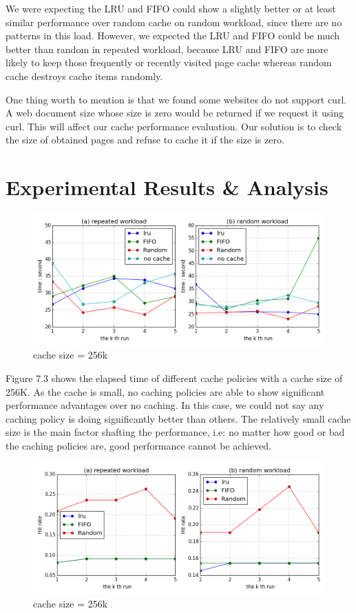 \documentclass[paper=a4, fontsize=11pt]{scrartcl} %
\numberwithin{equation}{section} %
\numberwithin{figure}{section} %
\numberwithin{table}{section} %
\begin{document}
We were expecting the LRU and FIFO could show a slightly better or at least similar performance over random cache on random workload, since there are no patterns in this load. However, we expected the LRU and FIFO could be much better than random in repeated workload, because LRU and FIFO are more likely to keep those frequently or recently visited page cache whereas random cache destroys cache items randomly. 

One thing worth to mention is that we found some websites do not support curl. A web document size whose size is zero would be returned if we request it using curl. This will affect our cache performance evaluation. Our solution is to check the size of obtained pages and refuse to cache it if the size is zero. 

\section{Experimental Results \& Analysis}
\begin{figure}[h]
  \centering
  \includegraphics[width=\textwidth]{../data/time256k}
  \caption{cache size = 256k}
  \label{fig:time256k}
\end{figure}
Figure 7.3 shows the elapsed time of different cache policies with a cache size of 256K. As the cache is small, no caching policies are able to show significant performance advantages over no caching. In this case, we could not say any caching policy is doing significantly better than others. The relatively small cache size is the main factor shafting the performance, i.e: no matter how good or bad the caching policies are, good performance cannot be achieved.
\begin{figure}[h]
  \centering
  \includegraphics[width=\textwidth]{../data/hit256k}
  \caption{cache size = 256k}
  \label{fig:hit256k}
\end{figure}
\end{document}
